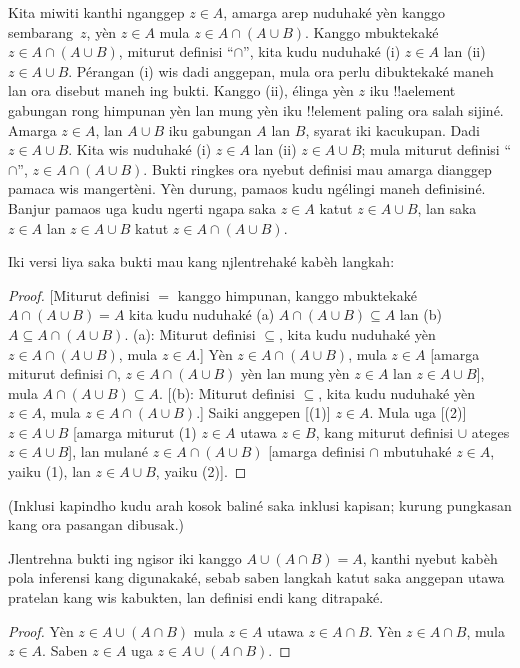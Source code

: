 \documentclass[../../../include/open-logic-section]{subfiles}
\begin{document}
Kita miwiti kanthi nganggep $z \in A$, amarga arep
nuduhaké yèn kanggo sembarang~$z$, yèn $z \in A$
mula $z \in A \cap (A \cup B)$. Kanggo mbuktekaké
$z \in A \cap (A \cup B)$, miturut definisi
``$\cap$'', kita kudu nuduhaké (i) $z \in A$
lan (ii) $z \in A \cup B$. Pérangan (i) wis
dadi anggepan, mula ora perlu dibuktekaké maneh
lan ora disebut maneh ing bukti. Kanggo (ii), élinga
yèn $z$ iku !!a{element} gabungan rong himpunan
yèn lan mung yèn iku !!{element} paling ora salah
sijiné. Amarga $z \in A$, lan $A \cup B$ iku
gabungan $A$ lan $B$, syarat iki kacukupan.
Dadi $z \in A \cup B$. Kita wis nuduhaké
(i) $z \in A$ lan (ii) $z \in A \cup B$;
mula miturut definisi ``$\cap$'',
$z \in A \cap (A \cup B)$. Bukti ringkes
ora nyebut definisi mau amarga dianggep pamaca
wis mangertèni. Yèn durung, pamaos
kudu ngélingi maneh definisiné. Banjur
pamaos uga kudu ngerti ngapa saka $z
\in A$ katut $z \in A \cup B$, lan saka
$z \in A$ lan $z \in A \cup B$ katut
$z \in A \cap (A \cup B)$.

Iki versi liya saka bukti mau kang njlentrehaké
kabèh langkah:
\begin{proof}{}
[Miturut definisi $=$ kanggo himpunan, kanggo
  mbuktekaké $A \cap (A \cup B) = A$
  kita kudu nuduhaké (a)
  $A \cap (A \cup B) \subseteq A$ lan (b)
  $A \subseteq A \cap (A \cup B)$.
  (a): Miturut definisi $\subseteq$, kita kudu
  nuduhaké yèn $z \in A \cap (A \cup B)$,
  mula $z \in A$.] Yèn $z \in A
\cap (A \cup B)$, mula $z \in A$
[amarga miturut definisi $\cap$,
$z \in A \cap (A \cup B)$ yèn lan mung
yèn $z \in A$ lan $z \in A \cup B$],
mula $A \cap (A \cup B) \subseteq A$.
[(b): Miturut definisi $\subseteq$,
kita kudu nuduhaké yèn $z \in A$,
mula $z \in A \cap (A \cup B)$.]
Saiki anggepen [(1)] $z \in A$.
Mula uga [(2)] $z \in A \cup B$
[amarga miturut (1) $z \in A$ utawa
$z \in B$, kang miturut definisi $\cup$
ateges $z \in A \cup B$], lan mulané
$z \in A \cap (A \cup B)$
[amarga definisi $\cap$ mbutuhaké
$z \in A$, yaiku (1), lan
$z \in A \cup B$, yaiku (2)].
\end{proof}
(Inklusi kapindho kudu arah kosok baliné saka inklusi kapisan; kurung pungkasan kang ora pasangan dibusak.)

\begin{prob}
Jlentrehna bukti ing ngisor iki kanggo
$A \cup (A \cap B) = A$, kanthi nyebut kabèh
pola inferensi kang digunakaké, sebab saben
langkah katut saka anggepan utawa pratelan kang
wis kabukten, lan definisi endi kang ditrapaké.
\begin{proof}
  Yèn $z \in A \cup (A \cap B)$ mula $z \in A$
  utawa $z \in A \cap B$. Yèn
  $z \in A \cap B$, mula $z \in A$.
  Saben $z \in A$ uga $z \in A \cup (A
  \cap B)$.
\end{proof}
\end{prob}
\end{document}
